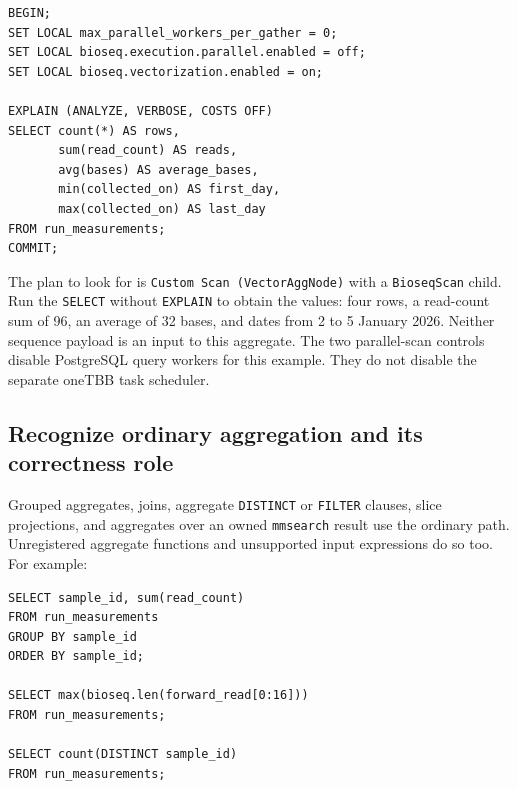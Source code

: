 \par\noindent\begin{minipage}{\linewidth}
\begin{lstlisting}[style=bioseq-appendix-sql,
  caption={Ask for and inspect a plain vector aggregate.}]
BEGIN;
SET LOCAL max_parallel_workers_per_gather = 0;
SET LOCAL bioseq.execution.parallel.enabled = off;
SET LOCAL bioseq.vectorization.enabled = on;

EXPLAIN (ANALYZE, VERBOSE, COSTS OFF)
SELECT count(*) AS rows,
       sum(read_count) AS reads,
       avg(bases) AS average_bases,
       min(collected_on) AS first_day,
       max(collected_on) AS last_day
FROM run_measurements;
COMMIT;
\end{lstlisting}
\end{minipage}

The plan to look for is \texttt{Custom Scan (VectorAggNode)} with a
\texttt{BioseqScan} child. Run the \texttt{SELECT} without
\texttt{EXPLAIN} to obtain the values: four rows, a read-count sum of 96,
an average of 32 bases, and dates from 2 to 5 January 2026.
Neither sequence payload is an input to this aggregate.
The two parallel-scan controls disable PostgreSQL query workers for this
example. They do not disable the separate oneTBB task scheduler.

\subsection{Recognize ordinary aggregation and its correctness role}

Grouped aggregates, joins, aggregate \texttt{DISTINCT} or \texttt{FILTER}
clauses, slice projections, and aggregates over an owned
\texttt{mmsearch} result use the ordinary path. Unregistered aggregate
functions and unsupported input expressions do so too. For example:

\par\noindent\begin{minipage}{\linewidth}
\begin{lstlisting}[style=bioseq-appendix-sql,
  caption={Useful queries that do not select the plain vector aggregate.}]
SELECT sample_id, sum(read_count)
FROM run_measurements
GROUP BY sample_id
ORDER BY sample_id;

SELECT max(bioseq.len(forward_read[0:16]))
FROM run_measurements;

SELECT count(DISTINCT sample_id)
FROM run_measurements;
\end{lstlisting}
\end{minipage}


